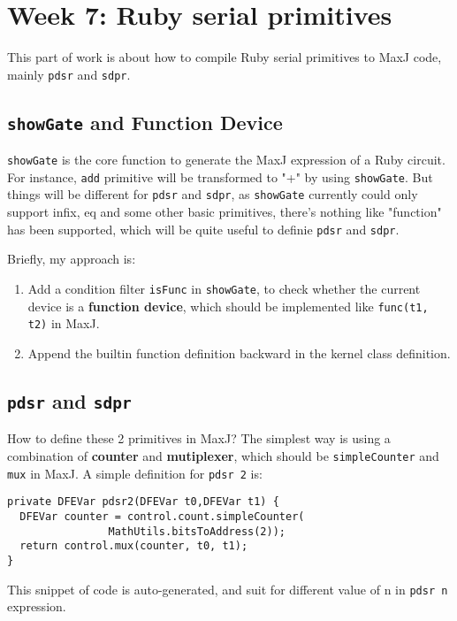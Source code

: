 \documentclass{article}
\begin{document}
\section{Week 7: Ruby serial primitives}

This part of work is about how to compile Ruby serial primitives to MaxJ code, mainly \texttt{pdsr} and \texttt{sdpr}. 

\subsection{\texttt{showGate} and Function Device}
\texttt{showGate} is the core function to generate the MaxJ expression of a Ruby circuit. For instance, \texttt{add} primitive will be transformed to "+" by using \texttt{showGate}. But things will be different for \texttt{pdsr} and \texttt{sdpr}, as \texttt{showGate} currently could only support infix, eq and some other basic primitives, there's nothing like "function" has been supported, which will be quite useful to definie \texttt{pdsr} and \texttt{sdpr}.

Briefly, my approach is:
\begin{enumerate}
\item Add a condition filter \texttt{isFunc} in \texttt{showGate}, to check whether the current device is a \textbf{function device}, which should be implemented like \texttt{func(t1, t2)} in MaxJ. 
\item Append the builtin function definition backward in the kernel class definition. 
\end{enumerate}

\subsection{\texttt{pdsr} and \texttt{sdpr}}
How to define these 2 primitives in MaxJ? The simplest way is using a combination of \textbf{counter} and \textbf{mutiplexer}, which should be \texttt{simpleCounter} and \texttt{mux} in MaxJ. A simple definition for \texttt{pdsr 2} is:

\begin{lstlisting}
private DFEVar pdsr2(DFEVar t0,DFEVar t1) {
  DFEVar counter = control.count.simpleCounter(
    			MathUtils.bitsToAddress(2));
  return control.mux(counter, t0, t1);
}
\end{lstlisting}

This snippet of code is auto-generated, and suit for different value of n in \texttt{pdsr n} expression.
\end{document}
